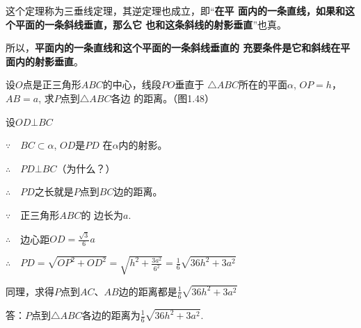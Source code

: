 这个定理称为三垂线定理，其逆定理也成立，即“\textbf{在平
面内的一条直线，如果和这个平面的一条斜线垂直，那么它
也和这条斜线的射影垂直}”也真。

所以，\textbf{平面内的一条直线和这个平面的一条斜线垂直的
充要条件是它和斜线在平面内的射影垂直}。


\begin{example}
  设$O$点是正三角形$ABC$的中心，线段$PO$垂直于
$\triangle ABC$所在的平面$\alpha$, $OP=h$，$AB=a$, 求$P$点到$\triangle ABC$各边
的距离。（图1.48）
\end{example}

\begin{figure}[htp]
  \centering
{}  
  \caption{}
\end{figure}

\begin{solution}
设$OD\bot BC$

$\because\quad BC\subset \alpha$, $OD$是$PD$
在$\alpha$内的射影。

$\therefore\quad PD\bot BC$（为什么？）

$\therefore\quad PD$之长就是$P$点到$BC$边的距离。

$\because\quad $正三角形$ABC$的
边长为$a$.

$\therefore\quad $边心距$OD=\frac{\sqrt{3}}{6}a$

$\therefore\quad PD=\sqrt{OP^2+OD^2}=\sqrt{h^2+\frac{3a^2}{6^2}}=\frac{1}{6}\sqrt{36h^2+3a^2}$

同理，求得$P$点到$AC$、$AB$边的距离都是$\frac{1}{6}\sqrt{36h^2+3a^2}$

答：$P$点到$\triangle ABC$各边的距离为$\frac{1}{6}\sqrt{36h^2+3a^2}$.
\end{solution}



